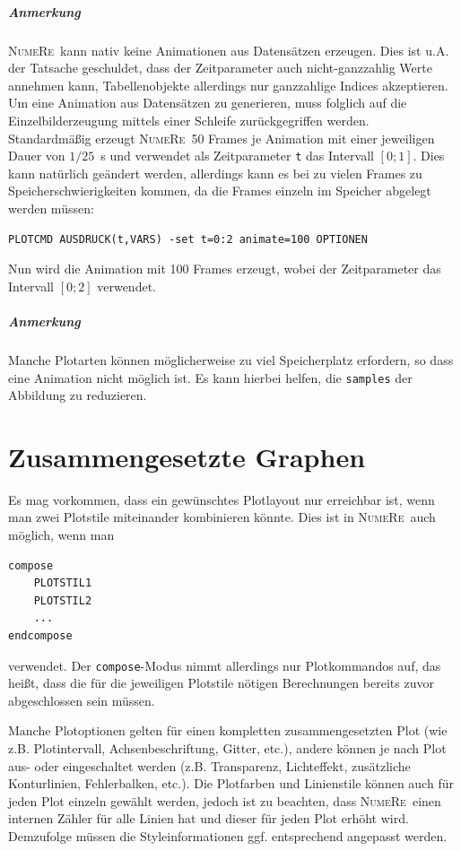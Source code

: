 \documentclass[DIV=14,headsepline,footsepline]{scrbook}
\newcommand{\NR}{\textsc{Nu\-me\-Re}}
\begin{document}
			\paragraph{Anmerkung}
				\NR\ kann nativ keine Animationen aus Datensätzen erzeugen. Dies ist u.A. der Tatsache geschuldet, dass der Zeitparameter auch nicht-ganzzahlig Werte annehmen kann, Tabellenobjekte allerdings nur ganzzahlige Indices akzeptieren. Um eine Animation aus Datensätzen zu generieren, muss folglich auf die Einzelbilderzeugung mittels einer Schleife zurückgegriffen werden.\bigskip\\
			Standardmäßig erzeugt \NR\ 50 Frames je Animation mit einer jeweiligen Dauer von $1/25$~s und verwendet als Zeitparameter \verb+t+ das Intervall $[0;1]$. Dies kann natürlich geändert werden, allerdings kann es bei zu vielen Frames zu Speicherschwierigkeiten kommen, da die Frames einzeln im Speicher abgelegt werden müssen:
			\begin{lstlisting}
PLOTCMD AUSDRUCK(t,VARS) -set t=0:2 animate=100 OPTIONEN
			\end{lstlisting}
			Nun wird die Animation mit 100 Frames erzeugt, wobei der Zeitparameter das Intervall $[0;2]$ verwendet.
			\paragraph{Anmerkung}
				Manche Plotarten können möglicherweise zu viel Speicherplatz erfordern, so dass eine Animation nicht möglich ist. Es kann hierbei helfen, die \verb+samples+ der Abbildung zu reduzieren.
		\chapter{Zusammengesetzte Graphen}
			Es mag vorkommen, dass ein gewünschtes Plotlayout nur erreichbar ist, wenn man zwei Plotstile miteinander kombinieren könnte. Dies ist in \NR\ auch möglich, wenn man
			\begin{lstlisting}
compose
	PLOTSTIL1
	PLOTSTIL2
	...
endcompose
			\end{lstlisting}
			verwendet. Der \verb+compose+-Modus nimmt allerdings nur Plotkommandos auf, das heißt, dass die für die jeweiligen Plotstile nötigen Berechnungen bereits zuvor abgeschlossen sein müssen.
			
			Manche Plotoptionen gelten für einen kompletten zusammengesetzten Plot (wie z.B. Plotintervall, Achsenbeschriftung, Gitter, etc.), andere können je nach Plot aus- oder eingeschaltet werden (z.B. Transparenz, Lichteffekt, zusätzliche Konturlinien, Fehlerbalken, etc.). Die Plotfarben und Linienstile können auch für jeden Plot einzeln gewählt werden, jedoch ist zu beachten, dass \NR\ einen internen Zähler für alle Linien hat und dieser für jeden Plot erhöht wird. Demzufolge müssen die Styleinformationen ggf. entsprechend angepasst werden.
			
\end{document}
